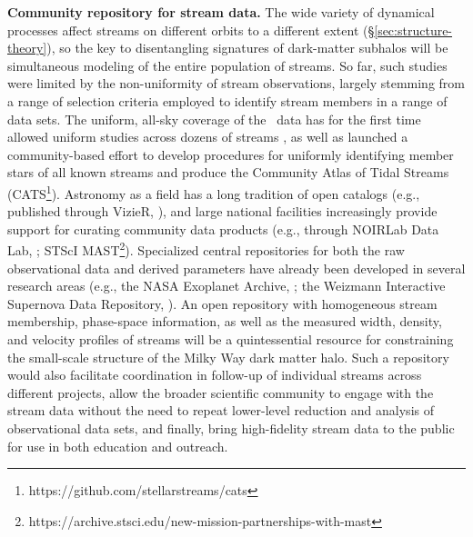 \documentclass[final,5p,times,twocolumn,authoryear]{elsarticle}
\begin{document}
\textbf{Community repository for stream data.}
The wide variety of dynamical processes affect streams on different orbits to a different extent (\S\ref{sec:structure-theory}), so the key to disentangling signatures of dark-matter subhalos will be simultaneous modeling of the entire population of streams.
So far, such studies were limited by the non-uniformity of stream observations, largely stemming from a range of selection criteria employed to identify stream members in a range of data sets.
The uniform, all-sky coverage of the \gaia\ data has for the first time allowed uniform studies across dozens of streams \citep[e.g.,][]{bonaca:2021,malhan:2022,ibata:2023}, as well as launched a community-based effort to develop procedures for uniformly identifying member stars of all known streams and produce the Community Atlas of Tidal Streams (CATS\footnote{https://github.com/stellarstreams/cats}).
Astronomy as a field has a long tradition of open catalogs (e.g., published through VizieR, \citealt{ochsenbein:2000}), and large national facilities increasingly provide support for curating community data products (e.g., through NOIRLab Data Lab, \citealt{nikutta:2020}; STScI MAST\footnote{https://archive.stsci.edu/new-mission-partnerships-with-mast}).
Specialized central repositories for both the raw observational data and derived parameters have already been developed in several research areas (e.g., the NASA Exoplanet Archive, \citealt{akeson:2013}; the Weizmann Interactive Supernova Data Repository, \citealt{yaron:2012}).
An open repository with homogeneous stream membership, phase-space information, as well as the measured width, density, and velocity profiles of streams will be a quintessential resource for constraining the small-scale structure of the Milky Way dark matter halo.
Such a repository would also facilitate coordination in follow-up of individual streams across different projects, allow the broader scientific community to engage with the stream data without the need to repeat lower-level reduction and analysis of observational data sets, and finally, bring high-fidelity stream data to the public for use in both education and outreach.
\end{document}
